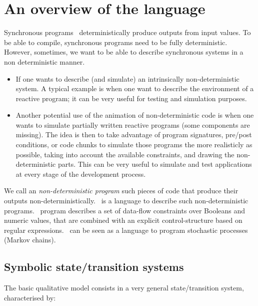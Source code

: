 
\section{An overview of the language}
\label{lutin-section}


Synchronous  programs~\cite{signal,esterel,lustre}  deterministically
produce  outputs   from  input  values.   To  be   able  to  compile,
synchronous programs need to be fully deterministic.
 However,  sometimes, we  want to  be able  to  describe synchronous
systems in a non deterministic manner.

\begin{itemize}
\item  If  one wants  to  describe  (and  simulate) an  intrinsically
  non-deterministic system.   A typical example  is when one  want to
  describe  the environment  of a  reactive program;  it can  be very
  useful for testing and simulation purposes.
  
\item  Another potential  use of  the animation  of non-deterministic
  code  is when  one  wants to  simulate  partially written  reactive
  programs (some  components are missing).  The idea is then  to take
  advantage  of  program  signatures,  pre/post conditions,  or  code
  chunks to simulate those programs the more realisticly as possible,
  taking  into account  the  available constraints,  and drawing  the
  non-deterministic parts.  This can be  very useful to  simulate and
  test applications at every stage of the development process.
\end{itemize}

We call an \emph{non-deterministic  program} such pieces of code that
produce their  outputs non-deterministically.  \lutin\  is a language
to  describe   such  non-deterministic  programs.    \lutin\  program
describes a  set of data-flow  constraints over Booleans  and numeric
values, that are combined with an explicit control-structure based on
regular expressions.
%
\lutin\  can be seen as a language to program stochastic processes
(Markov chains).





\subsection{Symbolic state/transition systems}
The   basic   qualitative   model   consists  in   a   very   general
state/transition system, characterised by:

